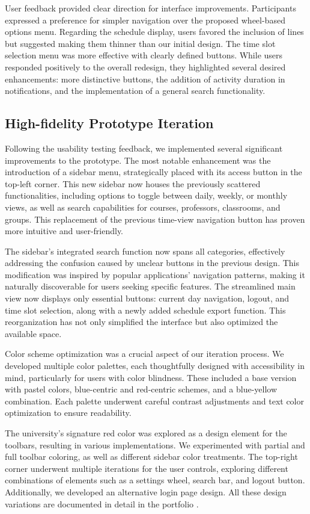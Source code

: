 \documentclass[sigconf,nonacm]{acmart}
\begin{document}
User feedback provided clear direction for interface improvements. Participants expressed a preference for simpler navigation over the proposed wheel-based options menu. Regarding the schedule display, users favored the inclusion of lines but suggested making them thinner than our initial design. The time slot selection menu was more effective with clearly defined buttons. While users responded positively to the overall redesign, they highlighted several desired enhancements: more distinctive buttons, the addition of activity duration in notifications, and the implementation of a general search functionality.

\subsection{High-fidelity Prototype Iteration}
Following the usability testing feedback, we implemented several significant improvements to the prototype. The most notable enhancement was the introduction of a sidebar menu, strategically placed with its access button in the top-left corner. This new sidebar now houses the previously scattered functionalities, including options to toggle between daily, weekly, or monthly views, as well as search capabilities for courses, professors, classrooms, and groups. This replacement of the previous time-view navigation button has proven more intuitive and user-friendly.

The sidebar's integrated search function now spans all categories, effectively addressing the confusion caused by unclear buttons in the previous design. This modification was inspired by popular applications' navigation patterns, making it naturally discoverable for users seeking specific features. The streamlined main view now displays only essential buttons: current day navigation, logout, and time slot selection, along with a newly added schedule export function. This reorganization has not only simplified the interface but also optimized the available space.

Color scheme optimization was a crucial aspect of our iteration process. We developed multiple color palettes, each thoughtfully designed with accessibility in mind, particularly for users with color blindness. These included a base version with pastel colors, blue-centric and red-centric schemes, and a blue-yellow combination. Each palette underwent careful contrast adjustments and text color optimization to ensure readability.

The university's signature red color was explored as a design element for the toolbars, resulting in various implementations. We experimented with partial and full toolbar coloring, as well as different sidebar color treatments. The top-right corner underwent multiple iterations for the user controls, exploring different combinations of elements such as a settings wheel, search bar, and logout button. Additionally, we developed an alternative login page design. All these design variations are documented in detail in the portfolio \cite{brainstorming}.
\end{document}
